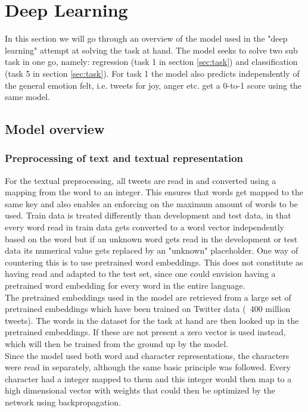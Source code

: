 
\section{Deep Learning}
In this section we will go through an overview of the model used in the "deep learning" attempt at solving the task at hand. The model seeks to solve two sub task in one go, namely: regression (task 1 in section \ref{sec:task}) and classification (task 5 in section \ref{sec:task}). For task 1 the model also predicts independently of the general emotion felt, i.e. tweets for joy, anger etc. get a 0-to-1 score using the same model.

\subsection{Model overview}

\subsubsection*{Preprocessing of text and textual representation} \label{sec:preprop}
For the textual preprocessing, all tweets are read in and converted using a mapping from the word to an integer. This ensures that words get mapped to the same key and also enables an enforcing on the maximum amount of words to be used. Train data is treated differently than development and test data, in that every word read in train data gets converted to a word vector independently based on the word but if an unknown word gets read in the development or test data its numerical value gets replaced by an "unknown" placeholder. One way of countering this is to use pretrained word embeddings. This does not constitute as having read and adapted to the test set, since one could envision having a pretrained word embedding for every word in the entire language.\\
The pretrained embeddings used in the model are retrieved from a large set of pretrained embeddings which have been trained on Twitter data (~400 million tweets). The words in the dataset for the task at hand are then looked up in the pretrained embeddings. If these are not present a zero vector is used instead, which will then be trained from the ground up by the model.\\
Since the model used both word and character representations, the characters were read in separately, although the same basic principle was followed. Every character had a integer mapped to them and this integer would then map to a high dimensional vector with weights that could then be optimized by the network using backpropagation. 

